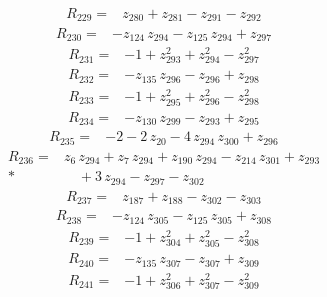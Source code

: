 \documentclass[10pt]{article}
\begin{document}
\begin{align*}
R_{229}={}& z_{280} + z_{281} - z_{291} - z_{292}
\end{align*}
\begin{align*}
R_{230}={}& - z_{124}\,z_{294} - z_{125}\,z_{294} + z_{297}
\end{align*}
\begin{align*}
R_{231}={}& - 1 + z_{293}^{2} + z_{294}^{2} - z_{297}^{2}
\end{align*}
\begin{align*}
R_{232}={}& - z_{135}\,z_{296} - z_{296} + z_{298}
\end{align*}
\begin{align*}
R_{233}={}& - 1 + z_{295}^{2} + z_{296}^{2} - z_{298}^{2}
\end{align*}
\begin{align*}
R_{234}={}& - z_{130}\,z_{299} - z_{293} + z_{295}
\end{align*}
\begin{align*}
R_{235}={}& - 2 - 2\,z_{20} - 4\,z_{294}\,z_{300} + z_{296}
\end{align*}
\begin{align*}
R_{236}={}& z_{6}\,z_{294} + z_{7}\,z_{294} + z_{190}\,z_{294} - z_{214}\,z_{301} + z_{293} \\*
&\quad + 3\,z_{294} - z_{297} - z_{302}
\end{align*}
\begin{align*}
R_{237}={}& z_{187} + z_{188} - z_{302} - z_{303}
\end{align*}
\begin{align*}
R_{238}={}& - z_{124}\,z_{305} - z_{125}\,z_{305} + z_{308}
\end{align*}
\begin{align*}
R_{239}={}& - 1 + z_{304}^{2} + z_{305}^{2} - z_{308}^{2}
\end{align*}
\begin{align*}
R_{240}={}& - z_{135}\,z_{307} - z_{307} + z_{309}
\end{align*}
\begin{align*}
R_{241}={}& - 1 + z_{306}^{2} + z_{307}^{2} - z_{309}^{2}
\end{align*}
\end{document}
